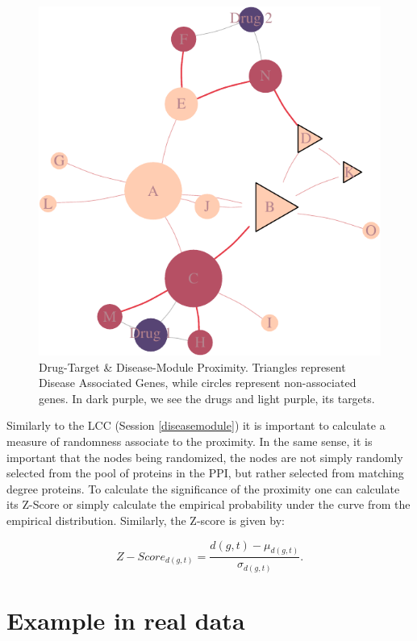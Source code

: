 \documentclass[
]{book}
\begin{document}
\begin{figure}
\centering
\includegraphics{NetMed_files/figure-latex/proximity-1.pdf}
\caption{\label{fig:proximity}Drug-Target \& Disease-Module Proximity. Triangles represent Disease Associated Genes, while circles represent non-associated genes. In dark purple, we see the drugs and light purple, its targets.}
\end{figure}

Similarly to the LCC (Session \ref{diseasemodule}) it is important to calculate a measure of randomness associate to the proximity. In the same sense, it is important that the nodes being randomized, the nodes are not simply randomly selected from the pool of proteins in the PPI, but rather selected from matching degree proteins. To calculate the significance of the proximity one can calculate its Z-Score or simply calculate the empirical probability under the curve from the empirical distribution. Similarly, the Z-score is given by:

\[
Z-Score_{d(g,t)} = \frac{d(g,t) - \mu_{d(g,t)}}{\sigma_{d(g,t)}}.
\]

\hypertarget{example-in-real-data-2}{%
\section{Example in real data}\label{example-in-real-data-2}}
\end{document}
